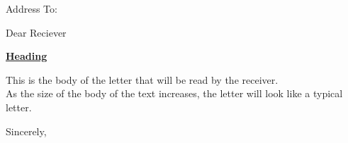 \documentclass[10pt, a4paper]{letter}
\date{\today}
\begin{document}
	\begin{letter}{Address To:}
			 
	\opening{Dear Reciever}

		\begin{center}
		\large{\textbf{\uline{Heading}}}
		\end{center}
%
	This is the body of the letter that will be read by the receiver.\\
	As the size of the body of the text increases, the letter will 
	look like a typical letter.
%
	\closing{Sincerely,}

	\end{letter}
\end{document}
